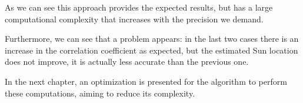 As we can see this approach provides the expected results, but has a large computational complexity that increases with the precision we demand. 

Furthermore, we can see that a problem appears: in the last two cases there is an increase in the correlation coefficient as expected, but the estimated Sun location does not improve, it is actually less accurate than the previous one.

In the next chapter, an optimization is presented for the algorithm to perform these computations, aiming to reduce its complexity.